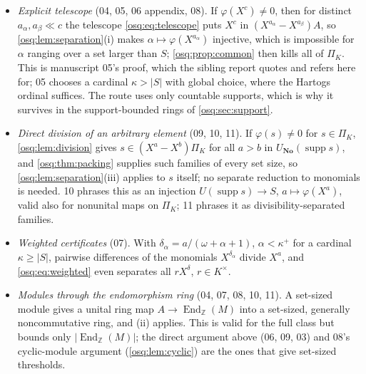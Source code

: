 \documentclass[11pt,letterpaper]{article}
\numberwithin{equation}{section}
\theoremstyle{definition}
\theoremstyle{remark}
\theoremstyle{plain}
\newcommand{\No}{\mathbf{No}}
\newcommand{\Z}{\mathbb Z}
\newcommand{\supp}{\operatorname{supp}}
\newcommand{\End}{\operatorname{End}}
\begin{document}
\begin{itemize}
\item \emph{Explicit telescope} (04, 05, 06 appendix, 08). If $\varphi(X^c)\ne0$, then
for distinct $a_\alpha,a_\beta\ll c$ the telescope \eqref{osq:eq:telescope} puts $X^c$ in
$(X^{a_\alpha}-X^{a_\beta})A$, so \cref{osq:lem:separation}(i) makes
$\alpha\mapsto\varphi(X^{a_\alpha})$ injective, which is impossible for $\alpha$ ranging over a
set larger than $S$; \cref{osq:prop:common} then kills all of $\Pi_K$. This is manuscript 05's
proof, which the sibling report \cite{RepoOdg} quotes and refers here for; 05 chooses a cardinal
$\kappa>|S|$ with global choice, where the Hartogs ordinal suffices. The route uses only countable
supports, which is why it survives in the support-bounded rings of \cref{osq:sec:support}.
\item \emph{Direct division of an arbitrary element} (09, 10, 11). If $\varphi(s)\ne0$ for
$s\in\Pi_K$, \cref{osq:lem:division} gives $s\in(X^a-X^b)\Pi_K$ for all $a>b$ in
$U_{\No}(\supp s)$, and \cref{osq:thm:packing} supplies such families of every set size, so
\cref{osq:lem:separation}(iii) applies to $s$ itself; no separate reduction to monomials is
needed. 10 phrases this as an injection $U(\supp s)\to S$, $a\mapsto\varphi(X^a)$, valid also
for nonunital maps on $\Pi_K$; 11 phrases it as divisibility-separated families.
\item \emph{Weighted certificates} (07). With $\delta_\alpha=a/(\omega+\alpha+1)$,
$\alpha<\kappa^+$ for a cardinal $\kappa\ge|S|$, pairwise differences of the monomials
$X^{\delta_\alpha}$ divide $X^a$, and \eqref{osq:eq:weighted} even separates all
$rX^\delta$, $r\in K^\times$.
\item \emph{Modules through the endomorphism ring} (04, 07, 08, 10, 11). A set-sized
module gives a unital ring map $A\to\End_\Z(M)$ into a set-sized, generally
noncommutative ring, and (ii) applies. This is valid for the full class but bounds only
$|\End_\Z(M)|$; the direct argument above (06, 09, 03) and 08's cyclic-module argument
(\cref{osq:lem:cyclic}) are the ones that give set-sized thresholds.
\end{itemize}
\end{document}
